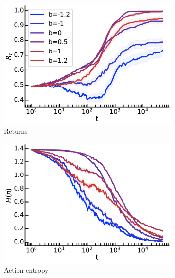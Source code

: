 \begin{figure}[!ht]
\centering
  \begin{subfigure}[b]{0.32\linewidth}
    \includegraphics[width=\textwidth]{articles/baselines/figs/baseline_4rooms/entropy_return}
    \caption{Returns}
  \end{subfigure}
    \begin{subfigure}[b]{0.32\linewidth}
    \includegraphics[width=\textwidth]{articles/baselines/figs/baseline_4rooms/entropy_pi}
    \caption{Action entropy}
  \end{subfigure}
  \begin{subfigure}[b]{0.32\linewidth}

\end{subfigure}
\end{figure}

